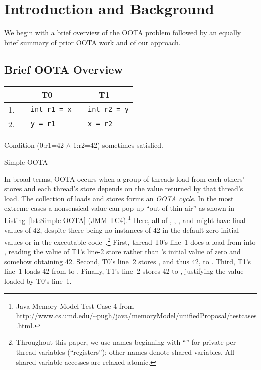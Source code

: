 \section{Introduction and Background}
\label{sec:Introduction}

We begin with a brief overview of the OOTA problem followed by an equally
brief summary of prior OOTA work and of our approach.

\subsection{Brief OOTA Overview}
\label{sec:Brief OOTA Overview}

\begin{listing}[bp]
{
\small
\begin{tabular}{r|l|l}
& \multicolumn{1}{c}{T0} & \multicolumn{1}{c}{T1} \\
\hline
1. &
\texttt{~~int r1 = x} &
	\texttt{~~int r2 = y} \\
2. &
\texttt{~~y = r1} &
	\texttt{~~x = r2} \\
\end{tabular}

\vspace{0.1in}
Condition (0:r1=42 $\wedge$ 1:r2=42)
sometimes satisfied.
}
\caption{Simple OOTA}
\label{lst:Simple OOTA}
\end{listing}

In broad terms, OOTA occurs when a group of threads load from each others'
stores and each thread's store depends on the value returned by that
thread's load.
The collection of loads and stores forms an \emph{OOTA cycle}.
In the most extreme cases a nonsensical value can pop up ``out of thin air''
as shown in
Listing~\ref{lst:Simple OOTA} (JMM TC4).\footnote{
	Java Memory Model Test Case 4 from
	\url{http://www.cs.umd.edu/~pugh/java/memoryModel/unifiedProposal/testcases.html}.}
Here, all of , , , and  might have final
values of 42, despite there being no instances of 42 in the default-zero
initial values or in the executable
code~\cite{PaulEMcKenney2020RelaxedGuideRelaxed}.\footnote{
	Throughout this paper, we use names beginning with ``''
	for private per-thread variables (``registers''); other names
	denote shared variables.
	All shared-variable accesses are relaxed atomic.}
First, thread T0's line~1 does a load from  into ,
reading the value of T1's line-2 store rather than 's initial
value of zero and somehow obtaining 42.
Second, T0's line~2 stores , and thus 42, to .
Third, T1's line~1 loads 42 from  to .
Finally, T1's line~2 stores 42 to , justifying the value loaded
by T0's line~1.

